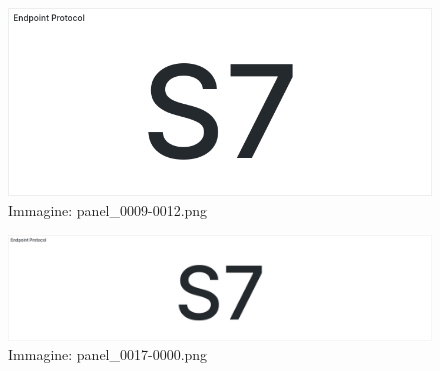 \documentclass[a4paper,10pt]{article}
\begin{document}
\begin{figure}[h!]
    \centering
    \includegraphics[width=\textwidth]{panel_0009-0012.png}
    \caption{Immagine: panel\_0009-0012.png}
\end{figure}

\begin{figure}[h!]
    \centering
    \includegraphics[width=\textwidth]{panel_0017-0000.png}
    \caption{Immagine: panel\_0017-0000.png}
\end{figure}
\end{document}
